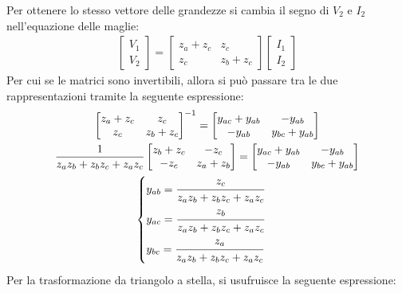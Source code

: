 \documentclass{article}
\numberwithin{equation}{subsection}
\begin{document}
Per ottenere lo stesso vettore delle grandezze si cambia il segno di $V_2$ e $I_2$ nell'equazione delle maglie:
\begin{gather*}
    \begin{bmatrix}
        V_1\\V_2
    \end{bmatrix}=\begin{bmatrix}
        z_a+z_c&z_c\\z_c&z_b+z_c
    \end{bmatrix}\begin{bmatrix}
        I_1\\I_2
    \end{bmatrix}
\end{gather*}
Per cui se le matrici sono invertibili, allora si può passare tra le due rappresentazioni tramite la seguente espressione:
\begin{gather*}
    \begin{bmatrix}
        z_a+z_c&z_c\\z_c&z_b+z_c
    \end{bmatrix}^{-1}=\begin{bmatrix}
        y_{ac}+y_{ab}&-y_{ab}\\-y_{ab}&y_{bc}+y_{ab}
    \end{bmatrix}\\
    \displaystyle\frac{1}{z_az_b+z_bz_c+z_az_c}\begin{bmatrix}
        z_b+z_c&-z_c\\-z_c&z_a+z_b
    \end{bmatrix}=\begin{bmatrix}
        y_{ac}+y_{ab}&-y_{ab}\\-y_{ab}&y_{bc}+y_{ab}
    \end{bmatrix}\\
    \begin{cases}
        y_{ab}=\displaystyle\frac{\strut z_c}{\strut z_az_b+z_bz_c+z_az_c}\\
        y_{ac}=\displaystyle\frac{\strut z_b}{\strut z_az_b+z_bz_c+z_az_c}\\
        y_{bc}=\displaystyle\frac{\strut z_a}{\strut z_az_b+z_bz_c+z_az_c}
    \end{cases}
\end{gather*}
Per la trasformazione da triangolo a stella, si usufruisce la seguente espressione:
\end{document}
